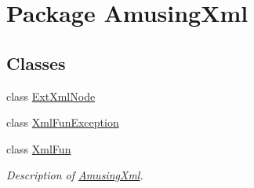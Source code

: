 \hypertarget{namespace_amusing_xml}{
\section{Package AmusingXml}
\label{namespace_amusing_xml}
}
\subsection*{Classes}
\begin{DoxyCompactItemize}
\item 
class \hyperlink{class_amusing_xml_1_1_ext_xml_node}{ExtXmlNode}
\item 
class \hyperlink{class_amusing_xml_1_1_xml_fun_exception}{XmlFunException}
\item 
class \hyperlink{class_amusing_xml_1_1_xml_fun}{XmlFun}
\begin{DoxyCompactList}\small\item\em Description of \hyperlink{namespace_amusing_xml}{AmusingXml}. \item\end{DoxyCompactList}\end{DoxyCompactItemize}
